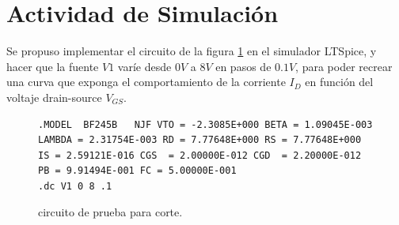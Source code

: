 \section{Actividad de Simulación}
    Se propuso implementar el circuito de la figura \ref{crkt:jfet-corte} en el simulador LTSpice, y hacer que la fuente
    $V1$ varíe desde $0V$ a $8V$ en pasos de $0.1V$, para poder recrear una curva que exponga el comportamiento de la
    corriente $I_D$ en función del voltaje drain-source $V_{GS}$.
    \begin{figure}[!ht]
      \centering
      \begin{minipage}{0.45\textwidth}
        \caption{circuito de prueba para corte.}
        \label{crkt:jfet-corte}
      \end{minipage}
      \hfill
      \begin{minipage}{0.45\textwidth}
        \begin{lstlisting}[style=ltspice, caption={Parámetros de simulación LTspice}, label=list:jfet-corte]
.MODEL  BF245B   NJF VTO = -2.3085E+000 BETA = 1.09045E-003 LAMBDA = 2.31754E-003 RD = 7.77648E+000 RS = 7.77648E+000 IS = 2.59121E-016 CGS  = 2.00000E-012 CGD  = 2.20000E-012 PB = 9.91494E-001 FC = 5.00000E-001
.dc V1 0 8 .1
        \end{lstlisting}
      \end{minipage}
    \end{figure}

